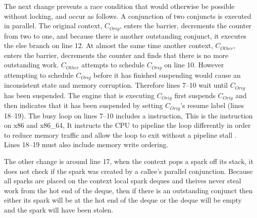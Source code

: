 The next change prevents a race condition that would otherwise be possible
without locking, and occur as follows.
A conjunction of two conjuncts is executed in parallel.
The original context, $C_{Orig}$,
enters the barrier, decrements the counter from two to one,
and because there is another outstanding conjunct,
it executes the else branch on line 12.
At almost the same time another context, $C_{Other}$,
enters the barrier, decrements the counter and finds that there is no more
outstanding work.
$C_{Other}$ attempts to schedule $C_{Orig}$ on line 10.
However attempting to schedule $C_{Orig}$ before it has finished suspending
would cause an inconsistent state and memory corruption.
Therefore lines 7--10 wait until $C_{Orig}$ has been suspended.
The engine that is executing $C_{Orig}$ first suspends $C_{Orig}$ and then
indicates that it has been suspended by setting $C_{Orig}$'s resume label
(lines 18--19).
The busy loop on lines 7--10 includes a  instruction,
This is the  instruction on x86 and x86\_64,
It instructs the CPU to pipeline the loop differently in order to reduce
memory traffic and allow the loop to exit without a pipeline stall
\citep{intel:pause}.
Lines 18--19 must also include memory write ordering.

The other change is around line 17,
when the context pops a spark off its stack, it does not check if the spark
was created by a callee's parallel conjunction.
Because all sparks are placed on the context local spark deques and
theives never steal work from the hot end of the deque,
then if there is an outstanding conjunct then either
its spark will be at the hot end of the deque
or the deque will be empty and the spark will have been stolen.

